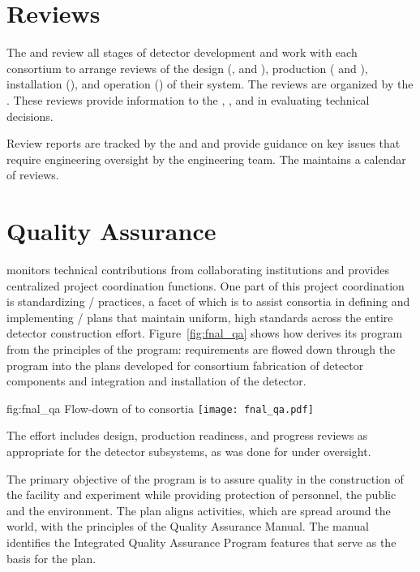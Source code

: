 \section{Reviews}
\label{sec:es-tc-reviews}

The  and  review all stages of detector development
and work with each consortium to arrange reviews of the design
(,  and ), production (
and ), installation (), and operation
() of their system. The reviews are organized by the
 .  These
reviews provide information to the , , and 
in evaluating technical decisions. 

Review reports are tracked by the   and  and provide
guidance on key issues that require engineering oversight by the
 engineering team. The   maintains a
calendar of  reviews. 

\section{Quality Assurance}
\label{sec:es-tc-qa}

  monitors technical contributions from
collaborating institutions and provides centralized project
coordination functions. One part of this project coordination is
standardizing / practices, a facet
of which is to assist consortia in defining and implementing
/ plans that maintain uniform, high
standards across the entire detector construction
effort. Figure~\ref{fig:fnal_qa} shows how  
derives its  program from the principles of the \fnal {} program:
requirements are flowed down through the 
 program into the  plans developed for consortium fabrication of
detector components and integration and installation of the detector.
\begin{dunefigure}[\fnal QA]{fig:fnal_qa}
  {Flow-down of \fnal {} to consortia}
  \texttt{[image: fnal\_qa.pdf]}
\end{dunefigure}
The  effort includes design, production readiness, and
progress reviews as appropriate for the  detector
subsystems, as was done for  under 
oversight.

The primary objective of the   program is
to assure quality in the construction of the  facility and
 experiment while providing protection of
 personnel, the public and the environment. The
 plan aligns   activities, which
are spread around the world, with the principles of the \fnal Quality
Assurance Manual. The manual identifies the \fnal Integrated Quality
Assurance Program features that serve as the basis for the
  plan.

